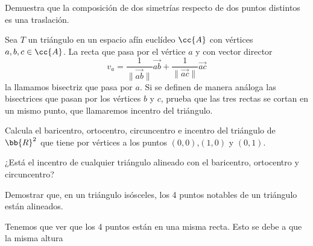 \begin{ejercicio}
    Demuestra que la composición de dos simetrías respecto de dos puntos distintos es una traslación.
\end{ejercicio}

\begin{ejercicio}
    Sea $T$ un triángulo en un espacio afín euclídeo $\cc{A}$ con vértices $a, b, c \in \cc{A}$. La recta que pasa por el vértice $a$ y con vector director
    \begin{equation*}
        v_a=\frac{1}{\|\vec{ab}\|} \vec{ab} + \frac{1}{\|\vec{ac}\|}\vec{ac}
    \end{equation*}
    la llamamos bisectriz que pasa por $a$. Si se definen de manera análoga las bisectrices que pasan por los vértices $b$ y $c$, prueba que las tres rectas se cortan en un mismo punto, que llamaremos incentro del triángulo.
\end{ejercicio}

\begin{ejercicio}
    Calcula el baricentro, ortocentro, circuncentro e incentro del triángulo de $\bb{R}^2$ que tiene por vértices a los puntos $(0, 0)$,$(1, 0)$ y $(0, 1)$.
\end{ejercicio}

\begin{ejercicio}
    ¿Está el incentro de cualquier triángulo alineado con el baricentro, ortocentro y circuncentro?
\end{ejercicio}

\begin{ejercicio}
    Demostrar que, en un triángulo isósceles, los 4 puntos notables de un triángulo están alineados.


    Tenemos que ver que los 4 puntos están en una misma recta. Esto se debe a que la misma altura
\end{ejercicio}